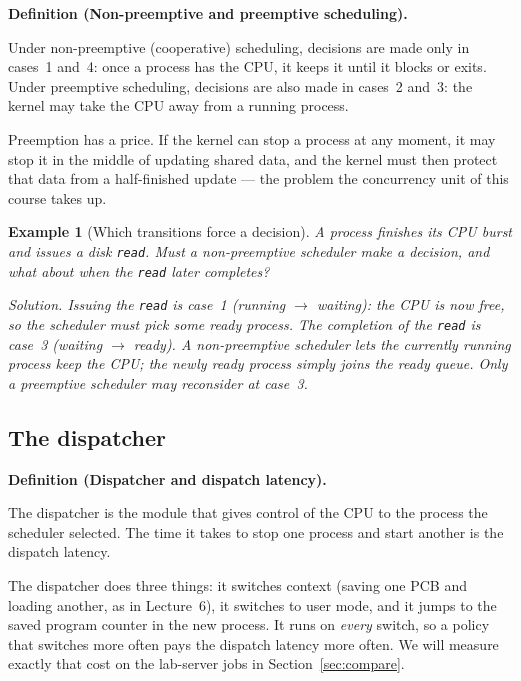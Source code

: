 \documentclass[11pt]{article}
\newtheorem{example}{Example}
\newenvironment{definitionbox}[1]{%
  \par\noindent\textbf{Definition (#1).}\ \itshape
}{\par\vspace{0.3em}}
\begin{document}
\begin{definitionbox}{Non-preemptive and preemptive scheduling}
Under non-preemptive (cooperative) scheduling, decisions are made only in
cases~1 and~4: once a process has the CPU, it keeps it until it blocks or
exits. Under preemptive scheduling, decisions are also made in cases~2 and~3:
the kernel may take the CPU away from a running process.
\end{definitionbox}

Preemption has a price. If the kernel can stop a process at any moment, it may
stop it in the middle of updating shared data, and the kernel must then protect
that data from a half-finished update --- the problem the concurrency unit of
this course takes up.

\begin{example}[Which transitions force a decision]
A process finishes its CPU burst and issues a disk \texttt{read}. Must a
non-preemptive scheduler make a decision, and what about when the \texttt{read}
later completes?

\emph{Solution.} Issuing the \texttt{read} is case~1 (running $\to$ waiting):
the CPU is now free, so the scheduler must pick some ready process. The
completion of the \texttt{read} is case~3 (waiting $\to$ ready). A
non-preemptive scheduler lets the currently running process keep the CPU; the
newly ready process simply joins the ready queue. Only a preemptive scheduler
may reconsider at case~3.
\end{example}

\subsection*{The dispatcher}

\begin{definitionbox}{Dispatcher and dispatch latency}
The dispatcher is the module that gives control of the CPU to the process the
scheduler selected. The time it takes to stop one process and start another is
the dispatch latency.
\end{definitionbox}

The dispatcher does three things: it switches context (saving one PCB and
loading another, as in Lecture~6), it switches to user mode, and it jumps to the
saved program counter in the new process. It runs on \emph{every} switch, so a
policy that switches more often pays the dispatch latency more often. We will
measure exactly that cost on the lab-server jobs in Section~\ref{sec:compare}.
\end{document}
